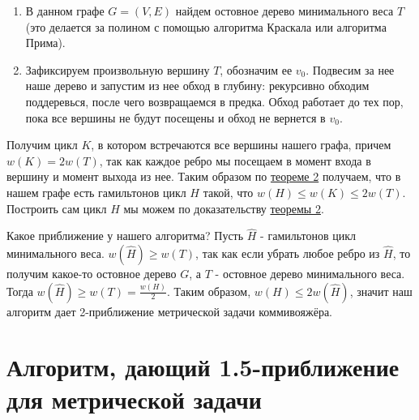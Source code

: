 \documentclass[A4, twocolumn]{article}
\begin{document}
\begin{enumerate}
	\item В данном графе $G=(V,E)$ найдем остовное дерево минимального веса $T$ (это делается за полином с помощью алгоритма Краскала или алгоритма Прима).
	\item Зафиксируем произвольную вершину $T$, обозначим ее $v_0$. Подвесим за нее наше дерево и запустим из нее обход в глубину: рекурсивно обходим поддеревься, после чего возвращаемся в предка. Обход работает до тех пор, пока все вершины не будут посещены и обход не вернется в $v_0$.
\end{enumerate}

Получим цикл $K$, в котором встречаются все вершины нашего графа, причем $w(K) = 2w(T)$, так как каждое ребро мы посещаем в момент входа в вершину и момент выхода из нее. Таким образом по \hyperref[Th2]{теореме 2} получаем, что в нашем графе есть гамильтонов цикл $H$ такой, что $w(H) \leq w(K) \leq 2w(T)$. Построить сам цикл $H$ мы можем по доказательству \hyperref[Th2]{теоремы 2}.

Какое приближение у нашего алгоритма? Пусть $\hat{H}$ - гамильтонов цикл минимального веса. $w(\hat{H}) \geq w(T)$, так как если убрать любое ребро из $\hat{H}$, то получим какое-то остовное дерево $G$, а $T$ - остовное дерево минимального веса. Тогда $w(\hat{H}) \geq w(T) = \frac{w(H)}{2}$. Таким образом, $w(H) \leq 2w(\hat{H})$, значит наш алгоритм дает 2-приближение метрической задачи коммивояжёра.


\section{\textbf{Алгоритм, дающий 1.5-приближение для метрической задачи}}
\end{document}
